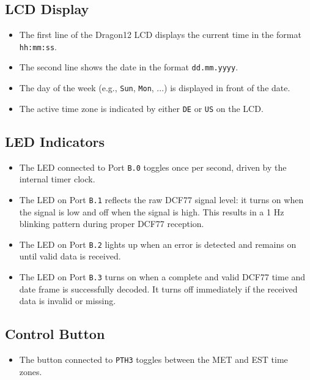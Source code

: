 \documentclass[a4paper,12pt]{article}
\begin{document}
\subsection{LCD Display}
\begin{itemize}
    \item The first line of the Dragon12 LCD displays the current time in the format \texttt{hh:mm:ss}.
    \item The second line shows the date in the format \texttt{dd.mm.yyyy}.
    \item The day of the week (e.g., \texttt{Sun}, \texttt{Mon}, ...) is displayed in front of the date.
    \item The active time zone is indicated by either \texttt{DE} or \texttt{US} on the LCD.
\end{itemize}

\subsection{LED Indicators}
\begin{itemize}
    \item The LED connected to Port \texttt{B.0} toggles once per second, driven by the internal timer clock.
    \item The LED on Port \texttt{B.1} reflects the raw DCF77 signal level: it turns on when the signal is low and off when the signal is high.  
    This results in a 1 Hz blinking pattern during proper DCF77 reception.
    \item The LED on Port \texttt{B.2} lights up when an error is detected and remains on until valid data is received.
    \item The LED on Port \texttt{B.3} turns on when a complete and valid DCF77 time and date frame is successfully decoded.  
    It turns off immediately if the received data is invalid or missing.
\end{itemize}

\subsection{Control Button}
\begin{itemize}
    \item The button connected to \texttt{PTH3} toggles between the MET and EST time zones.
\end{itemize}

\newpage

\end{document}

